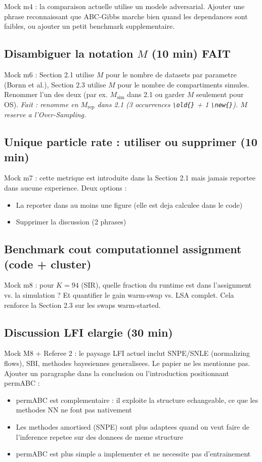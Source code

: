 \documentclass[11pt]{article}
\newcommand{\done}{\textcolor{done}{\textbf{FAIT}}}
\begin{document}
Mock m4 : la comparaison actuelle utilise un modele adversarial. Ajouter une phrase reconnaissant que ABC-Gibbs marche bien quand les dependances sont faibles, ou ajouter un petit benchmark supplementaire.

\subsection{Disambiguer la notation $M$ (10 min) \done}

Mock m6 : Section 2.1 utilise $M$ pour le nombre de datasets par parametre (Bornn et al.), Section 2.3 utilise $M$ pour le nombre de compartiments simules. Renommer l'un des deux (par ex. $M_{\text{sim}}$ dans 2.1 ou garder $M$ seulement pour OS). \textit{Fait : renomme en $M_{\mathrm{rep}}$ dans 2.1 (3 occurrences \texttt{\textbackslash old\{\}} + 1 \texttt{\textbackslash new\{\}}). $M$ reserve a l'Over-Sampling.}

\subsection{Unique particle rate : utiliser ou supprimer (10 min)}

Mock m7 : cette metrique est introduite dans la Section 2.1 mais jamais reportee dans aucune experience. Deux options :
\begin{itemize}[nosep]
    \item La reporter dans au moins une figure (elle est deja calculee dans le code)
    \item Supprimer la discussion (2 phrases)
\end{itemize}

\subsection{Benchmark cout computationnel assignment (code + cluster)}

Mock m8 : pour $K=94$ (SIR), quelle fraction du runtime est dans l'assignment vs. la simulation ? Et quantifier le gain warm-swap vs. LSA complet. Cela renforce la Section 2.3 sur les swaps warm-started.

\subsection{Discussion LFI elargie (30 min)}

Mock M8 + Referee 2 : le paysage LFI actuel inclut SNPE/SNLE (normalizing flows), SBI, methodes bayesiennes generalisees. Le papier ne les mentionne pas. Ajouter un paragraphe dans la conclusion ou l'introduction positionnant permABC :
\begin{itemize}[nosep]
    \item permABC est complementaire : il exploite la structure echangeable, ce que les methodes NN ne font pas nativement
    \item Les methodes amortised (SNPE) sont plus adaptees quand on veut faire de l'inference repetee sur des donnees de meme structure
    \item permABC est plus simple a implementer et ne necessite pas d'entrainement
\end{itemize}
\end{document}
